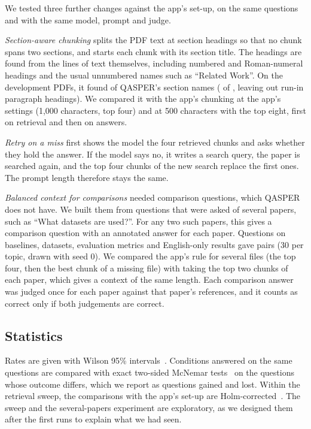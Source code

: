 We tested three further changes against the app's set-up, on the same questions and with the same
model, prompt and judge.

\emph{Section-aware chunking} splits the PDF text at section headings so that no chunk spans two
sections, and starts each chunk with its section title. The headings are found from the lines of
text themselves, including numbered and Roman-numeral headings and the usual unnumbered names such
as ``Related Work''. On the \PapersDownloaded{} development PDFs, it found \SectionsCoverage{} of
QASPER's section names (\SectionsCoverageK{} of \SectionsCoverageN{}, leaving out run-in
paragraph headings). We compared it with the app's chunking at the app's settings (1,000
characters, top four) and at 500 characters with the top eight, first on retrieval and then on
answers.

\emph{Retry on a miss} first shows the model the four retrieved chunks and asks whether they hold
the answer. If the model says no, it writes a search query, the paper is searched again, and the
top four chunks of the new search replace the first ones. The prompt length therefore stays the
same.

\emph{Balanced context for comparisons} needed comparison questions, which QASPER does not have.
We built them from questions that were asked of several papers, such as ``What datasets are
used?''. For any two such papers, this gives a comparison question with an annotated answer for
each paper. Questions on baselines, datasets, evaluation metrics and English-only results gave
\ComparePairs{} pairs (30 per topic, drawn with seed 0). We compared the app's rule for several
files (the top four, then the best chunk of a missing file) with taking the top two chunks of each
paper, which gives a context of the same length. Each comparison answer was judged once for each
paper against that paper's references, and it counts as correct only if both judgements are
correct.

\subsection{Statistics}

Rates are given with Wilson 95\% intervals~\cite{wilson1927}. Conditions answered on the same
questions are compared with exact two-sided McNemar tests~\cite{mcnemar1947} on the questions
whose outcome differs, which we report as questions gained and lost. Within the retrieval sweep,
the \SweepComparisons{} comparisons with the app's set-up are Holm-corrected~\cite{holm1979}.
The sweep and the several-papers experiment are exploratory, as we designed them after the first
runs to explain what we had seen.
